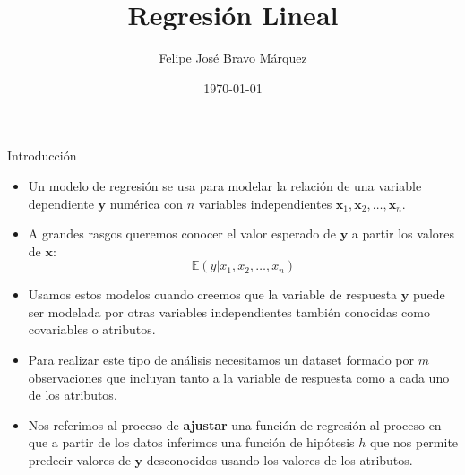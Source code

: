 \documentclass[handout]{beamer}
\title{Regresión Lineal}
\author[Felipe Bravo Márquez]{\footnotesize
 \textcolor[rgb]{0.00,0.00,1.00}{Felipe José Bravo Márquez}}
\date{ \today }
\begin{document}
\begin{frame}
\titlepage


\end{frame}





\begin{frame}{Introducción}
\scriptsize{
\begin{itemize}

 \item Un modelo de regresión se usa para modelar la relación de una variable dependiente $\mathbf{y}$ numérica con $n$ variables independientes $\mathbf{x}_1, \mathbf{x}_2, \dots, \mathbf{x}_n$. 
 
 \item A grandes rasgos queremos conocer el valor esperado de $\mathbf{y}$ a partir los valores de $\mathbf{x}$:
 \begin{displaymath}
 \mathbb{E}(y|x_1,x_2,\dots,x_n)
 \end{displaymath}

 
 \item Usamos estos modelos cuando creemos que la variable de respuesta $\mathbf{y}$ puede ser modelada por otras variables independientes también conocidas como covariables o atributos.
 
 \item Para realizar este tipo de análisis necesitamos un dataset formado por $m$ observaciones que incluyan tanto a la variable de respuesta como a cada uno de los atributos.
 
 \item Nos referimos al proceso de \textbf{ajustar} una función de regresión al proceso en que a partir de los datos inferimos una función de hipótesis $h$ que nos permite predecir valores de $\mathbf{y}$ desconocidos usando los valores de los atributos.

 
\end{itemize}



} 
 
\end{frame}
\end{document}
